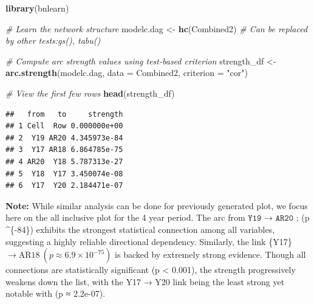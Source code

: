 \documentclass[
]{article}
\newenvironment{Shaded}{\begin{snugshade}}{\end{snugshade}}
\newcommand{\AttributeTok}[1]{\textcolor[rgb]{0.13,0.29,0.53}{#1}}
\newcommand{\CommentTok}[1]{\textcolor[rgb]{0.56,0.35,0.01}{\textit{#1}}}
\newcommand{\FunctionTok}[1]{\textcolor[rgb]{0.13,0.29,0.53}{\textbf{#1}}}
\newcommand{\NormalTok}[1]{#1}
\newcommand{\OtherTok}[1]{\textcolor[rgb]{0.56,0.35,0.01}{#1}}
\newcommand{\SpecialCharTok}[1]{\textcolor[rgb]{0.81,0.36,0.00}{\textbf{#1}}}
\newcommand{\StringTok}[1]{\textcolor[rgb]{0.31,0.60,0.02}{#1}}
\begin{document}
\begin{Shaded}
\begin{Highlighting}[]
\FunctionTok{library}\NormalTok{(bnlearn)}

\CommentTok{\# Learn the network structure}
\NormalTok{modelc.dag }\OtherTok{\textless{}{-}} \FunctionTok{hc}\NormalTok{(Combined2)  }\CommentTok{\# Can be replaced by other tests:gs(), tabu()}

\CommentTok{\# Compute arc strength values using test{-}based criterion}
\NormalTok{strength\_df }\OtherTok{\textless{}{-}} \FunctionTok{arc.strength}\NormalTok{(modelc.dag, }\AttributeTok{data =}\NormalTok{ Combined2, }\AttributeTok{criterion =} \StringTok{"cor"}\NormalTok{)}

\CommentTok{\# View the first few rows}
\FunctionTok{head}\NormalTok{(strength\_df)}
\end{Highlighting}
\end{Shaded}

\begin{verbatim}
##   from   to     strength
## 1 Cell  Row 0.000000e+00
## 2  Y19 AR20 4.345973e-84
## 3  Y17 AR18 6.864785e-75
## 4 AR20  Y18 5.787313e-27
## 5  Y18  Y17 3.450074e-08
## 6  Y17  Y20 2.184471e-07
\end{verbatim}

\textbf{Note:} While similar analysis can be done for previously
generated plot, we focus here on the all inclusive plot for the 4 year
period. The arc from \(\texttt{Y19 → AR20}\) ; (p 
\^{}\{-84\}) exhibits the strongest statistical connection
among all variables, suggesting a highly reliable directional
dependency. Similarly, the link \{Y17\}
\(\rightarrow \mathrm {AR18} \ (p \approx 6.9 \times 10^{-75})\) is
backed by extremely strong evidence. Though all connections are
statistically significant (p \textless{} 0.001), the strength
progressively weakens down the list, with the Y17 → Y20 link being the
least strong yet notable with (p ≈ 2.2e-07).

\begin{Shaded}
\end{Shaded}
\end{document}
